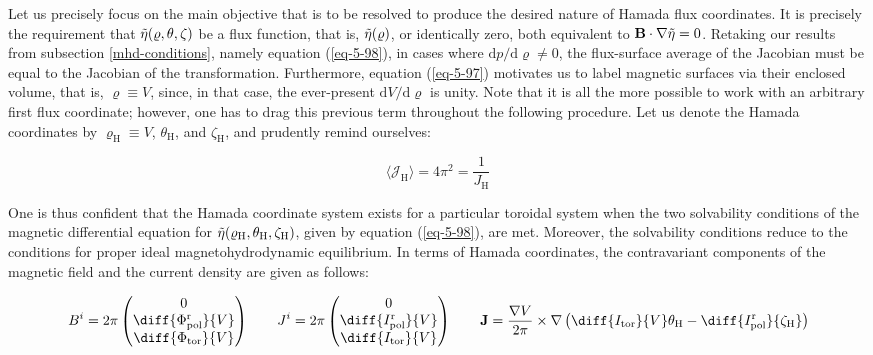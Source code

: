 \quad Let us precisely focus on the main objective that is to be resolved to produce the desired nature of Hamada flux coordinates. It is precisely the requirement that $\Tilde{\eta}(\varrho,\theta,\zeta)$ be a flux function, that is, $\Tilde{\eta}(\varrho)$, or identically zero, both equivalent to $\mathbf{B}\cdot\nabla\Tilde{\eta}=0$. Retaking our results from subsection \ref{mhd-conditions}, namely equation (\ref{eq-5-98}), in cases where ${\mathrm{d}p}/{\mathrm{d}\varrho}\neq0$, the flux-surface average of the Jacobian must be equal to the Jacobian of the transformation. Furthermore, equation (\ref{eq-5-97}) motivates us to label magnetic surfaces via their enclosed volume, that is, $\varrho\equiv V$, since, in that case, the ever-present $\mathrm{d}{V}/\mathrm{d}{\varrho}$ is unity. Note that it is all the more possible to work with an arbitrary first flux coordinate; however, one has to drag this previous term throughout the following procedure. Let us denote the Hamada coordinates by $\varrho_\text{H}\equiv V$, $\theta_\text{H}$, and $\zeta_\text{H}$, and prudently remind ourselves:

\begin{equation}
    \langle\mathcal{J}_\text{H}\rangle=4\pi^2=\frac{1}{J_\text{H}}
\end{equation}

One is thus confident that the Hamada coordinate system exists for a particular toroidal system when the two solvability conditions of the magnetic differential equation for $\Tilde{\eta}(\varrho_\text{H},\theta_\text{H},\zeta_\text{H})$, given by equation (\ref{eq-5-98}), are met. Moreover, the solvability conditions reduce to the conditions for proper ideal magnetohydrodynamic equilibrium. In terms of Hamada coordinates, the contravariant components of the magnetic field and the current density are given as follows:

\begin{equation}
    B^i=2\pi\begin{pmatrix}
        0\\
        \diff{\Phi_\text{pol}^\text{r}}{V}\\
        \diff{\Phi_\text{tor}}{V}
    \end{pmatrix}\qquad J^i=2\pi\begin{pmatrix}
        0\\
        \diff{I_\text{pol}^\text{r}}{V}\\
        \diff{I_\text{tor}}{V}
    \end{pmatrix}\qquad\mathbf{J}=\frac{\nabla V}{2\pi}\times\nabla\left(\diff{I_\text{tor}}{V}\theta_\text{H}-\diff{I_\text{pol}^\text{r}}{\zeta_\text{H}}\right)
\end{equation}

